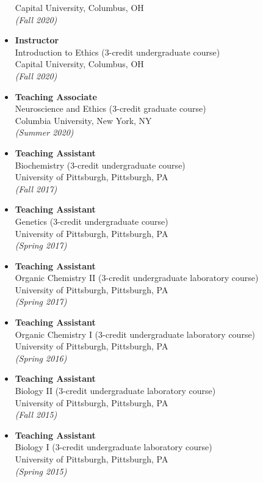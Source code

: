 \documentclass[
  letterpaper,
  DIV=11,
  numbers=noendperiod]{scrartcl}
\begin{document}
\begin{itemize}
  Capital University, Columbus, OH\\
  \emph{(Fall 2020)}
\item
  \textbf{Instructor}\\
  Introduction to Ethics (3-credit undergraduate course)\\
  Capital University, Columbus, OH\\
  \emph{(Fall 2020)}
\item
  \textbf{Teaching Associate}\\
  Neuroscience and Ethics (3-credit graduate course)\\
  Columbia University, New York, NY\\
  \emph{(Summer 2020)}
\item
  \textbf{Teaching Assistant}\\
  Biochemistry (3-credit undergraduate course)\\
  University of Pittsburgh, Pittsburgh, PA\\
  \emph{(Fall 2017)}
\item
  \textbf{Teaching Assistant}\\
  Genetics (3-credit undergraduate course)\\
  University of Pittsburgh, Pittsburgh, PA\\
  \emph{(Spring 2017)}
\item
  \textbf{Teaching Assistant}\\
  Organic Chemistry II (3-credit undergraduate laboratory course)\\
  University of Pittsburgh, Pittsburgh, PA\\
  \emph{(Spring 2017)}
\item
  \textbf{Teaching Assistant}\\
  Organic Chemistry I (3-credit undergraduate laboratory course)\\
  University of Pittsburgh, Pittsburgh, PA\\
  \emph{(Spring 2016)}
\item
  \textbf{Teaching Assistant}\\
  Biology II (3-credit undergraduate laboratory course)\\
  University of Pittsburgh, Pittsburgh, PA\\
  \emph{(Fall 2015)}
\item
  \textbf{Teaching Assistant}\\
  Biology I (3-credit undergraduate laboratory course)\\
  University of Pittsburgh, Pittsburgh, PA\\
  \emph{(Spring 2015)}
\end{itemize}
\end{document}
